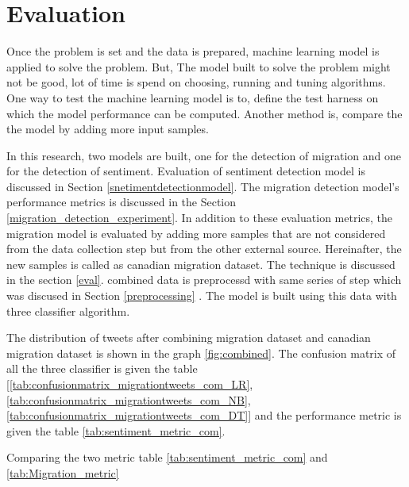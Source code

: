 \chapter{Evaluation}\label{chap:evaluation}
Once the problem is set and the data is prepared,  machine learning model is applied to solve the problem. But, The model built to solve the problem might not be good, lot of time is spend on choosing, running and tuning algorithms. One way to test the machine learning model is to, define the test harness on which the model performance can be computed. Another method is, compare the the model by adding more input samples. 

In this research, two models are built, one for the detection of migration and one for the detection of sentiment. Evaluation of sentiment detection model is discussed in Section \ref{snetimentdetectionmodel}. The migration detection model's performance metrics is discussed in the Section \ref{migration_detection_experiment}. In addition to these evaluation metrics, the migration model is evaluated by adding more samples that are not considered from the data collection step but from the other external source. Hereinafter, the new samples is called as canadian migration dataset. The technique is discussed in the section \ref{eval}. combined data is preprocessd with same series of step which was discused in Section \ref{preprocessing} . The model is built using this data with three classifier algorithm. 

The distribution of tweets after combining migration dataset and canadian migration dataset is shown in the graph \ref{fig:combined}. The confusion matrix of all the three classifier is given the table [\ref{tab:confusionmatrix_migrationtweets_com_LR},\ref{tab:confusionmatrix_migrationtweets_com_NB},\ref{tab:confusionmatrix_migrationtweets_com_DT}] and the performance metric is given the table \ref{tab:sentiment_metric_com}.

Comparing the two metric table  \ref{tab:sentiment_metric_com} and \ref{tab:Migration_metric}



